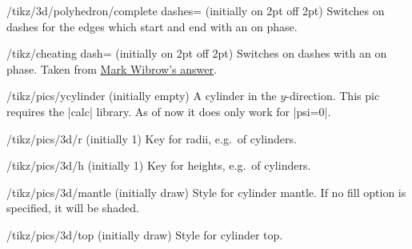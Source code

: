 \documentclass[a4paper,fleqn]{ltxdoc}
\begin{document}
\begin{key}{/tikz/3d/polyhedron/complete dashes= (initially {on 2pt off 2pt})}
 	    Switches on dashes for the edges which start and end with an 
		on phase.
\end{key}


\begin{key}{/tikz/cheating dash= (initially {on 2pt off 2pt})}
 	    Switches on dashes with an on phase.
		Taken from \href{https://tex.stackexchange.com/a/133357}{Mark Wibrow's answer}.
\end{key}

\begin{codeexample}[width=4.5cm,preamble={\usetikzlibrary{3dtools}}]
\end{codeexample}

\begin{key}{/tikz/pics/ycylinder (initially empty)}
 A cylinder in the $y$-direction. This pic requires the |calc| library. 
 As of now it does only work for |psi=0|.
\end{key}
\begin{key}{/tikz/pics/3d/r (initially 1)}
 Key for radii, e.g.\ of cylinders.
\end{key}
\begin{key}{/tikz/pics/3d/h (initially 1)}
 Key for heights,  e.g.\ of cylinders.
\end{key}
\begin{key}{/tikz/pics/3d/mantle (initially draw)}
 Style for cylinder mantle. If no fill option is specified, it will be shaded.
\end{key}
\begin{key}{/tikz/pics/3d/top (initially draw)}
 Style for cylinder top. 
\end{key}
\end{document}
